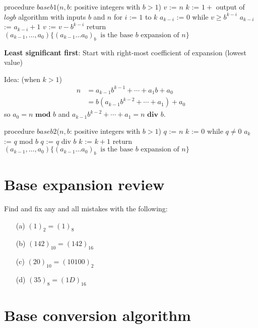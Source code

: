 \documentclass[12pt, oneside]{article}
\begin{document}
\vfill


\begin{algorithm}[caption={Calculating base $b$ expansion, from left}]
procedure $\textit{baseb1}$($n, b$: positive integers with $b > 1$)
$v$ := $n$
$k$ := $1 + $ output of $logb$ algorithm with inputs $b$ and $n$
for $i$ := $1$ to $k$
  $a_{k-i}$ := $0$
  while $v \geq b^{k-i}$
    $a_{k-i}$ := $a_{k-i} + 1$
    $v$ := $v -  b^{k-i}$
return $(a_{k-1}, \ldots, a_0) \{(a_{k-1} \ldots a_0)_b~\textrm{ is the base } b \textrm{ expansion of } n \}$
\end{algorithm}

\vfill
\vfill

\newpage
{\bf Least significant first}: Start with right-most coefficient of expansion (lowest value)

Idea: {\tiny(when $k > 1$)} 
    \begin{align*}
      n &= a_{k-1} b^{k-1} + \cdots + a_1 b + a_0 \\
        &= b ( a_{k-1} b^{k-2} + \cdots + a_1) + a_0\end{align*}
    so $a_0 = n \textbf{ mod } b$ and $a_{k-1} b^{k-2} + \cdots + a_1 = n \textbf{ div } b$.
\begin{algorithm}[caption={Calculating base $b$ expansion, from right}]
procedure $\textit{baseb2}$($n, b$: positive integers with $b > 1$)
$q$ := $n$
$k$ := $0$
while $q  \neq 0$
  $a_{k}$ := $q$ mod $b$
  $q$ := $q$ div $b$
  $k$ := $k+1$
return $(a_{k-1}, \ldots, a_0) \{(a_{k-1} \ldots a_0)_b~\textrm{ is the base } b \textrm{ expansion of } n \}$
\end{algorithm}


\vfill
\vfill
\newpage \vfill
\section*{Base expansion review}


Find and fix any and all mistakes with the following:
\begin{itemize}
\item[(a)] $(1)_2 = (1)_8$
\item[(b)] $(142)_{10} = (142)_{16}$
\item[(c)] $(20)_{10} = (10100)_2$
\item[(d)] $(35)_8 = (1D)_{16}$
\end{itemize} \vfill
\section*{Base conversion algorithm}
\end{document}
